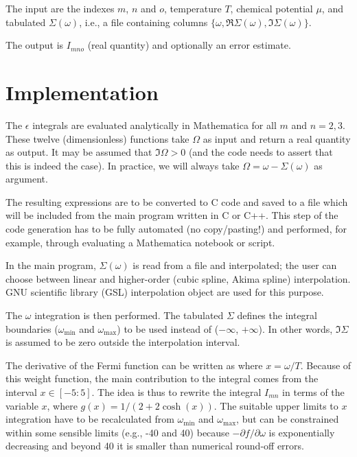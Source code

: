 \documentclass[prb,amsmath,amssymb,onecolumn,nopacs,floatfix,longbibliography]{revtex4-1}
\begin{document}
The input are the indexes $m$, $n$ and $o$, temperature $T$, chemical
potential $\mu$, and tabulated $\Sigma(\omega)$, i.e., a file
containing columns $\{\omega,\Re\Sigma(\omega),\Im\Sigma(\omega)\}$.

The output is $I_{mno}$ (real quantity) and optionally an error
estimate.


\section{Implementation}

The $\epsilon$ integrals
%
%
are evaluated analytically in Mathematica for all $m$ and $n=2,3$.
These twelve (dimensionless) functions take $\Omega$ as input and
return a real quantity as output. It may be assumed that $\Im \Omega >
0$ (and the code needs to assert that this is indeed the case). In
practice, we will always take $\Omega=\omega-\Sigma(\omega)$ as
argument.

The resulting expressions are to be converted to C code and saved to a
file which will be included from the main program written in C or C++.
This step of the code generation has to be fully automated (no
copy/pasting!) and performed, for example, through evaluating a
Mathematica notebook or script.

In the main program, $\Sigma(\omega)$ is read from a file and
interpolated; the user can choose between linear and higher-order
(cubic spline, Akima spline) interpolation. GNU scientific library (GSL)
interpolation object are used for this purpose.

\newcommand{\mn}{\mathrm{min}}
\newcommand{\mx}{\mathrm{max}}
\newcommand{\dx}{\mathrm{d}x}

The $\omega$ integration
%
%
is then performed. The tabulated $\Sigma$ defines the integral
boundaries ($\omega_\mn$ and $\omega_\mx$) to be used instead of
($-\infty$, $+\infty$). In other words, $\Im\Sigma$ is assumed to be
zero outside the interpolation interval.

The derivative of the Fermi function can be written as
%
%
where $x=\omega/T$. Because of this weight function, the main
contribution to the integral comes from the interval $x \in [-5:5]$.
The idea is thus to rewrite the integral $I_{mn}$ in terms of the
variable $x$,
%
\beq{
I_{mno} = \int \dx\, g(x) J_{mn}[T x - \Sigma(T x)] \left(
\frac{T x}{D} \right)^o,
}
%
where $g(x)=1/(2+2\cosh(x))$. The suitable upper limits to $x$
integration have to be recalculated from $\omega_\mn$ and
$\omega_\mx$, but can be constrained within some sensible limits
(e.g., -40 and 40) because $-\partial f/\partial \omega$ is
exponentially decreasing and beyond 40 it is smaller than numerical
round-off errors.
\end{document}
